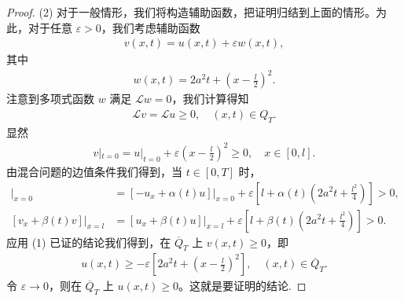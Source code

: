 \documentclass[../../main.tex]{subfiles}%
\begin{document}
\begin{proof}
(2) 对于一般情形，我们将构造辅助函数，把证明归结到上面的情形。为此，对于任意 $\varepsilon>0$，我们考虑辅助函数
\begin{align*}
v(x,t)=u(x,t)+\varepsilon w(x,t),
\end{align*}
其中
\begin{align}
w(x,t)=2a^2t+\left(x-\frac{l}{2}\right)^2. \label{eq:aux-w}
\end{align}
注意到多项式函数 $w$ 满足 $\mathcal{L}w=0$，我们计算得知
\begin{align*}
\mathcal{L}v=\mathcal{L}u\geqslant 0,\quad (x,t)\in Q_T.
\end{align*}
显然
\begin{align*}
v|_{t=0}=u|_{t=0}+\varepsilon\left(x-\frac{l}{2}\right)^2\geqslant 0,\quad x\in[0,l].
\end{align*}
由混合问题的边值条件我们得到，当 $t\in[0,T]$ 时，
\begin{align*}
[-v_x+\alpha(t)v]|_{x=0}
&=[-u_x+\alpha(t)u]|_{x=0}
+\varepsilon\left[l+\alpha(t)\left(2a^2t+\frac{l^2}{4}\right)\right]>0,\\
[v_x+\beta(t)v]|_{x=l}
&=[u_x+\beta(t)u]|_{x=l}
+\varepsilon\left[l+\beta(t)\left(2a^2t+\frac{l^2}{4}\right)\right]>0.
\end{align*}
应用 (1) 已证的结论我们得到，在 $\overline{Q}_T$ 上 $v(x,t)\geqslant 0$，即
\begin{align*}
u(x,t)\geqslant -\varepsilon\left[2a^2t+\left(x-\frac{l}{2}\right)^2\right],\quad (x,t)\in\overline{Q}_T.
\end{align*}
令 $\varepsilon\to 0$，则在 $\overline{Q}_T$ 上 $u(x,t)\geqslant 0$。这就是要证明的结论.
\end{proof}
\end{document}
